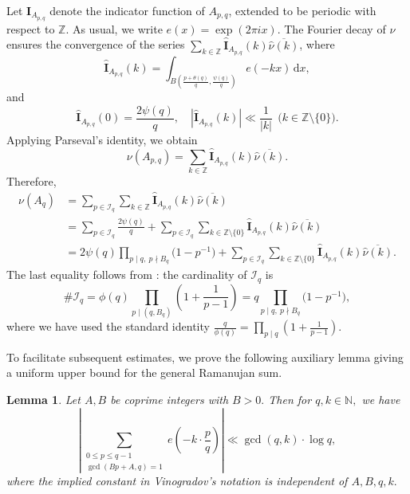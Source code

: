 \documentclass[12pt,a4paper,twoside]{article}
\newtheorem{lem}{Lemma}[section]
\begin{document}
Let $\mathbf{I}_{A_{p,q}}$ denote the indicator function of $A_{p,q}$,  extended to be periodic with respect to \(\mathbb{Z}\).  As usual, we write $e(x) = \exp(2\pi i x)$. The Fourier decay of $\nu$ ensures the convergence of the series $\sum_{k \in \mathbb{Z}} \widehat{\mathbf{I}}_{A_{p,q}}(k) \overline{\widehat{\nu}(k)}$, where
\[
\widehat{\mathbf{I}}_{A_{p,q}}(k) = \int_{B\left( \frac{p+\theta(q)}{q}, \frac{\psi(q)}{q} \right)} e(-k x) \, \mathrm{d}x, \] and \[ \widehat{\mathbf{I}}_{A_{p,q}}(0)=\frac{2\psi(q)}{q},\quad
|\widehat{\mathbf{I}}_{A_{p,q}}(k)| \ll \frac{1}{|k|}~~\big(k\in \mathbb{Z}\setminus \{0\}\big).
\]
Applying Parseval's identity, we obtain
\[
\nu(A_{p,q}) = \sum_{k \in \mathbb{Z}} \widehat{\mathbf{I}}_{A_{p,q}}(k) \overline{\widehat{\nu}(k)}.
\]
Therefore,
\begin{align*}
\nu(A_q) &= \sum_{p \in \mathcal{I}_q} \sum_{k \in \mathbb{Z}} \widehat{\mathbf{I}}_{A_{p,q}}(k) \overline{\widehat{\nu}(k)} \\
&= \sum_{p \in \mathcal{I}_q} \frac{2\psi(q)}{q} + \sum_{p \in \mathcal{I}_q} \sum_{k \in \mathbb{Z} \setminus \{0\}} \widehat{\mathbf{I}}_{A_{p,q}}(k) \overline{\widehat{\nu}(k)} \\
&= 2\psi(q) \prod_{ {p \mid q,~p \nmid B_q}} \bigl(1 - p^{-1}\bigr) + \sum_{p \in \mathcal{I}_q} \sum_{k \in \mathbb{Z} \setminus \{0\}} \widehat{\mathbf{I}}_{A_{p,q}}(k) \overline{\widehat{\nu}(k)}.
\end{align*}
The last equality follows from \cite[Proposition 1]{BHV24}: the cardinality of \( \mathcal{I}_q\) is
\begin{equation}\label{cardIq}
  \# \mathcal{I}_q = \phi(q) \prod_{p \mid (q, B_q)} \left(1 + \frac{1}{p-1}\right) = q \prod_{ {p \mid q,~p \nmid B_q}} \bigl(1 - p^{-1}\bigr),
\end{equation}
where we have used the standard identity $\displaystyle \frac{q}{\phi(q)} = \prod_{p \mid q} \left(1 + \frac{1}{p-1}\right)$.





To facilitate subsequent estimates, we prove the following auxiliary lemma giving a uniform upper bound for the general Ramanujan sum.
\begin{lem}\label{grs}
Let $A, B$ be coprime integers with $B>0.$ Then for $q,k\in\mathbb{N},$ we have
\[\left|\sum_{\substack{0\le p\le q-1 \\ \gcd(Bp+A,q)=1}}e(-k\cdot \frac{p}{q})\right|\ll \gcd(q,k)\cdot \log q,\]
where the implied constant in Vinogradov’s notation is independent of $A,B,q,k.$
\end{lem}
\end{document}
